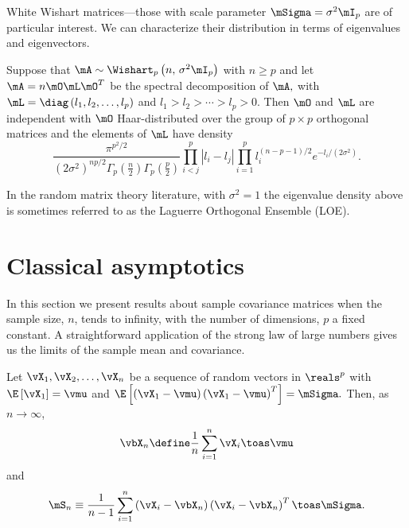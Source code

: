 White Wishart matrices---those with scale parameter $\mSigma = \sigma^2 \mI_p$
are of particular interest.  We can characterize their distribution in
terms of eigenvalues and eigenvectors.

\begin{proposition}
Suppose that
\(
    \mA
    \sim
    \Wishart_p \left(
        n, \,
        \sigma^2 \mI_p
    \right)
\)
with
\(
    n \geq p
\)
and let
\(
    \mA = n \mO \mL \mO^T
\)
be the spectral decomposition of
\(
    \mA,
\)
with
\(
    \mL
    =
    \diag \left(
        l_1,
        l_2,
        \ldots,
        l_p
    \right)
\)
and
\(
    l_1
    >
    l_2
    >
    \cdots
    >
    l_p
    >
    0.
\)
Then $\mO$ and $\mL$ are independent with $\mO$ Haar-distributed over
the group of $p \times p$ orthogonal matrices and the elements of $\mL$
have density
\begin{equation}\label{E:wishart-eig-density}
    \frac{ \pi^{p^2/2} }
         { \left( 2 \sigma^2 \right)^{np/2}
           \Gamma_p \left( \frac{n}{2} \right) 
           \Gamma_p \left( \frac{p}{2} \right) }
    \prod_{i < j}^p
        \left| l_i - l_j \right|
    \prod_{i=1}^p
        l_i^{(n-p-1)/2}
        e^{-l_i/(2 \sigma^2)}.
\end{equation}    
\end{proposition}
\noindent
In the random matrix theory literature, with $\sigma^2 = 1$ the eigenvalue density above is sometimes referred to as the Laguerre Orthogonal Ensemble (LOE).

\section{Classical asymptotics}

In this section we present results about sample covariance matrices when the sample size, $n$, tends to infinity, with the number of dimensions, $p$ a fixed constant.  A straightforward application of the strong law of large numbers gives us the limits of the sample mean and covariance.

\begin{lemma}\label{L:suff-stat-limits}
Let $\vX_1, \vX_2, \ldots, \vX_n$ be a sequence of \iid random vectors in $\reals^p$ with
\(
    \E \left[
        \vX_1
    \right]
    =
    \vmu
\)
and
\(
    \E \left[
        \left( \vX_1 - \vmu \right)
        \left( \vX_1 - \vmu \right)^T
    \right]
    =
    \mSigma.
\)
Then, as $n \to \infty$,
\[
    \vbX_n
    \define
    \frac{1}{n}
    \sum_{i=1}^n
        \vX_i
    \toas
    \vmu
\]
and
\[
    \mS_n
    \equiv
    \frac{1}{n-1}
    \sum_{i=1}^{n}
        \left( \vX_i - \vbX_n \right)
        \left( \vX_i - \vbX_n \right)^T
    \toas
    \mSigma.
\]
\end{lemma}

